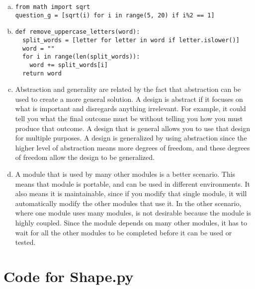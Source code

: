 \documentclass[12pt]{article}
\begin{document}
\begin{enumerate}[a)]
\item \begin{lstlisting}
from math import sqrt
question_g = [sqrt(i) for i in range(5, 20) if i%2 == 1]
\end{lstlisting}

\item \begin{lstlisting}
def remove_uppercase_letters(word):
  split_words = [letter for letter in word if letter.islower()]
  word = ""
  for i in range(len(split_words)):
    word += split_words[i]
  return word
\end{lstlisting}

\item Abstraction and generality are related by the fact that abstraction can be used to create a more general solution. A design is abstract if it focuses on what is important and disregards anything irrelevant. For example, it could tell you what the final outcome must be without telling you how you must produce that outcome. A design that is general allows you to use that design for multiple purposes. A design is generalized by using abstraction since the higher level of abstraction means more degrees of freedom, and these degrees of freedom allow the design to be generalized.

\item A module that is used by many other modules is a better scenario. This means that module is portable, and can be used in different environments. It also means it is maintainable, since if you modify that single module, it will automatically modify the other modules that use it. In the other scenario, where one module uses many modules, is not desirable because the module is highly coupled. Since the module depends on many other modules, it has to wait for all the other modules to be completed before it can be used or tested.

\end{enumerate}

\newpage

\lstset{language=Python, basicstyle=\tiny, breaklines=true, showspaces=false,
  showstringspaces=false, breakatwhitespace=true}

\def\thesection{\Alph{section}}

\section{Code for Shape.py}
\end{document}
